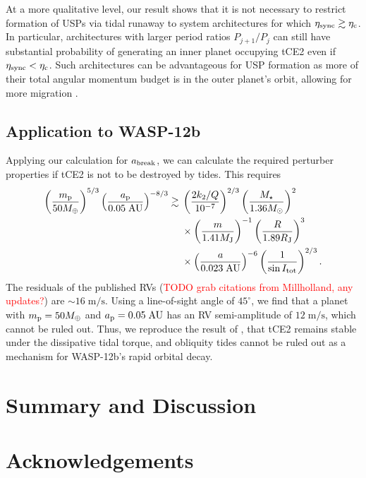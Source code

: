 \documentclass[
        fleqn,
        usenatbib,
    ]{mnras}
\newcommand*{\p}[1]{\left(#1\right)}
\begin{document}
At a more qualitative level, our result shows that it is not necessary to
restrict formation of USPs via tidal runaway to system architectures for which
$\eta_{\rm sync} \gtrsim \eta_{\rm c}$. In particular, architectures with larger
period ratios $P_{j + 1} / P_j$ can still have substantial probability of
generating an inner planet occupying tCE2 even if $\eta_{\rm sync} < \eta_{\rm
c}$. Such architectures can be advantageous for USP formation as more of their
total angular momentum budget is in the outer planet's orbit, allowing for more
migration \citep{fabrycky_otides, millholland2020formation}.

\subsection{Application to WASP-12b}\label{ss:disc_wasp12b}

Applying our calculation for $a_{\rm break}$, we can calculate the required
perturber properties if tCE2 is not to be destroyed by tides. This requires
\begin{align}
    \p{\frac{m_{\rm p}}{50 M_{\oplus}}}^{5/3}\p{\frac{a_{\rm
        p}}{0.05\;\mathrm{AU}}}^{-8/3} \gtrsim {}&
            \p{\frac{2k_2/Q}{10^{-7}}}^{2/3}
            \p{\frac{M_\star}{1.36 M_{\odot}}}^{2}\nonumber\\
        &\times \p{\frac{m}{1.41 M_{\rm J}}}^{-1}
            \p{\frac{R}{1.89R_{\rm J}}}^{3}\nonumber\\
        &\times \p{\frac{a}{0.023\;\mathrm{AU}}}^{-6}
            \p{\frac{1}{\sin I_{\rm tot}}}^{2/3}.
\end{align}
The residuals of the published RVs (\textcolor{red}{TODO grab citations from
Millholland, any updates?}) are $\sim 16\;\mathrm{m/s}$. Using a line-of-sight
angle of $45^\circ$, we find that a planet with $m_{\rm p} = 50M_{\oplus}$ and
$a_{\rm p} = 0.05\;\mathrm{AU}$ has an RV semi-amplitude of $12\;\mathrm{m/s}$,
which cannot be ruled out. Thus, we reproduce the result of
\citet{millholland_wasp12b}, that tCE2 remains stable under the dissipative
tidal torque, and obliquity tides cannot be ruled out as a mechanism for
WASP-12b's rapid orbital decay.

\section{Summary and Discussion}\label{s:summary}

\section{Acknowledgements}
\end{document}
